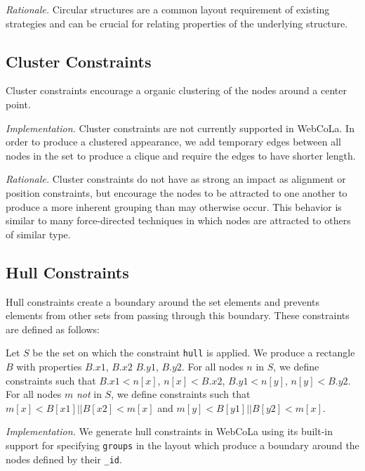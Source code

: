\emph{Rationale.} Circular structures are a common layout requirement of
existing strategies  and can be crucial for relating
properties of the underlying structure.

\subsection{Cluster Constraints}

Cluster constraints encourage a organic clustering of the nodes around
a center point.


\emph{Implementation.}
Cluster constraints are not currently supported in WebCoLa. In order to
produce a clustered appearance, we add temporary edges between all nodes
in the set to produce a clique and require the edges to have shorter length.

\emph{Rationale.}
Cluster constraints do not have as strong an impact as alignment or
position constraints, but encourage the nodes to be attracted to one
another to produce a more inherent grouping than may otherwise occur.
This behavior is similar to many force-directed techniques in which
nodes are attracted to others of similar type.

\subsection{Hull Constraints}

Hull constraints create a boundary around the set elements and prevents
elements from other sets from passing through this boundary. These 
constraints are defined as follows:

\begin{definition}
Let $S$ be the set on which the constraint \texttt{hull} is applied. We produce a
rectangle $B$ with properties $B.x1$, $B.x2$ $B.y1$, $B.y2$. For all nodes
$n$ in $S$, we define constraints such that $B.x1 < n[x]$, $n[x] < B.x2$,
$B.y1 < n[y]$, $n[y] < B.y2$. For all nodes $m$ \emph{not} in $S$, we define
constraints such that $m[x] < B[x1] || B[x2] < m[x]$ and $m[y] < B[y1] || B[y2] < m[x]$.
\end{definition}

\emph{Implementation.}
We generate hull constraints in WebCoLa using its built-in support for 
specifying \texttt{groups} in the layout which produce a boundary around 
the nodes defined by their \texttt{\_id}.

